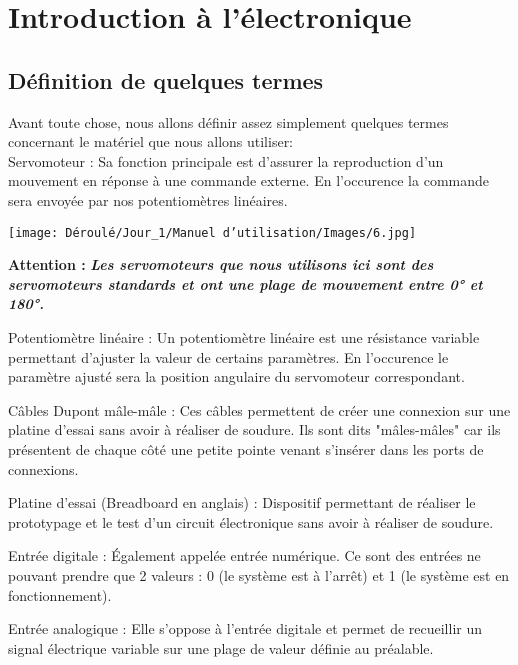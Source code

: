 \section{Introduction à l'électronique}
\subsection{Définition de quelques termes}
\begin{flushleft}
    Avant toute chose, nous allons définir assez simplement quelques termes concernant le matériel que nous allons utiliser:\\\vskip0.4cm
    Servomoteur : Sa fonction principale est d'assurer la reproduction d'un mouvement en réponse à une commande externe. En l'occurence la commande sera envoyée par nos potentiomètres linéaires.\\
    
    \begin{multicols}{2}
    \texttt{[image: Déroulé/Jour\_1/Manuel d'utilisation/Images/6.jpg]}
    
    \columnbreak
    
    \textbf{\large Attention : }\textbf{\textit{ Les servomoteurs que nous utilisons ici sont des servomoteurs standards et ont une plage de mouvement entre 0° et 180°.}}\\\vspace{0.2cm}
    \end{multicols}

    Potentiomètre linéaire : Un potentiomètre linéaire est une résistance variable permettant d'ajuster la valeur de certains paramètres. En l'occurence le paramètre ajusté sera la position angulaire du servomoteur correspondant.\\\vspace{0.2cm}
    
    Câbles Dupont mâle-mâle : Ces câbles permettent de créer une connexion sur une platine d'essai sans avoir à réaliser de soudure. Ils sont dits "mâles-mâles" car ils présentent de chaque côté une petite pointe venant s'insérer dans les ports de connexions.\\\vspace{0.2cm}
    
    Platine d'essai (Breadboard en anglais) : Dispositif permettant de réaliser le prototypage et le test d'un circuit électronique sans avoir à réaliser de soudure.\\\vspace{0.2cm}
    
    Entrée digitale : \'Egalement appelée entrée numérique. Ce sont des entrées ne pouvant prendre que 2 valeurs : 0 (le système est à l'arrêt) et 1 (le système est en fonctionnement).\\\vspace{0.2cm}
    
    Entrée analogique : Elle s'oppose à l'entrée digitale et permet de recueillir un signal électrique variable sur une plage de valeur définie au préalable.
\end{flushleft}

